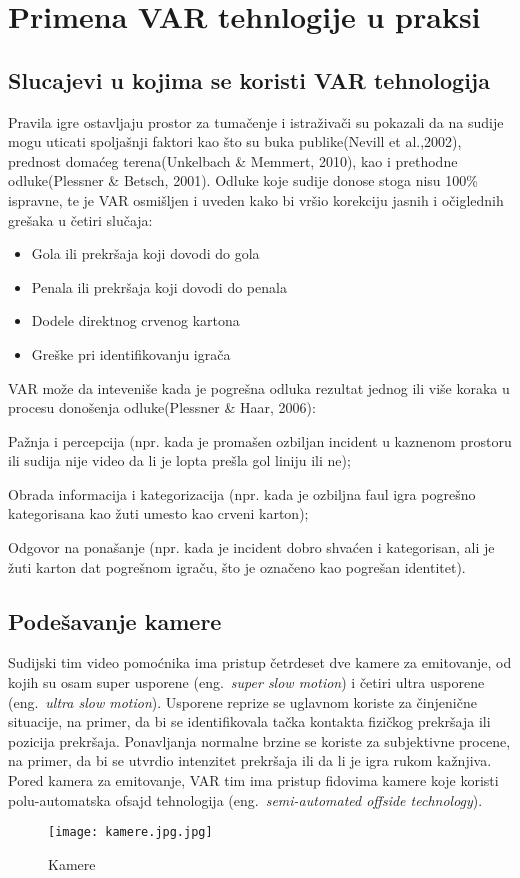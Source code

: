 \documentclass[a4paper]{article}
\begin{document}
\section{Primena VAR tehnlogije u praksi}
\subsection{Slucajevi u kojima se koristi VAR tehnologija}
Pravila igre ostavljaju prostor za tumačenje i istraživači su pokazali da na sudije mogu uticati spoljašnji faktori kao što su buka publike(Nevill et al.,2002), prednost domaćeg terena(Unkelbach \& Memmert, 2010), kao i prethodne odluke(Plessner \& Betsch, 2001). Odluke koje sudije donose stoga nisu 100\% ispravne, te je VAR osmišljen i uveden kako bi vršio korekciju jasnih i očiglednih grešaka u četiri slučaja:
\begin{itemize}
\item Gola ili prekršaja koji dovodi do gola
\item Penala ili prekršaja koji dovodi do penala
\item Dodele direktnog crvenog kartona
\item Greške pri identifikovanju igrača
\end{itemize}

VAR može da inteveniše kada je pogrešna odluka rezultat jednog ili više koraka u procesu donošenja odluke(Plessner \& Haar, 2006):

Pažnja i percepcija (npr. kada je promašen ozbiljan incident u kaznenom prostoru ili sudija nije video da li je lopta prešla gol liniju ili ne);

Obrada informacija i kategorizacija (npr. kada je ozbiljna faul igra pogrešno kategorisana kao žuti umesto kao crveni karton);

Odgovor na ponašanje (npr. kada je incident dobro shvaćen i kategorisan, ali je žuti karton dat pogrešnom igraču, što je označeno kao pogrešan identitet).
\subsection{Podešavanje kamere}
Sudijski tim video pomoćnika ima pristup četrdeset dve kamere za emitovanje, od kojih su osam super usporene (eng.~{\em super slow motion}) i četiri ultra usporene (eng.~{\em ultra slow motion}). Usporene reprize se uglavnom koriste za činjenične situacije, na primer, da bi se identifikovala tačka kontakta fizičkog prekršaja ili pozicija prekršaja. Ponavljanja normalne brzine se koriste za subjektivne procene, na primer, da bi se utvrdio intenzitet prekršaja ili da li je igra rukom kažnjiva. Pored kamera za emitovanje, VAR tim ima pristup fidovima kamere koje koristi polu-automatska ofsajd tehnologija (eng.~{\em semi-automated offside technology}).


\begin{figure}[h!]
\begin{center}
\texttt{[image: kamere.jpg.jpg]}
\end{center}
\caption{Kamere}
\label{kamere.jpg.jpg}
\end{figure}
\end{document}
